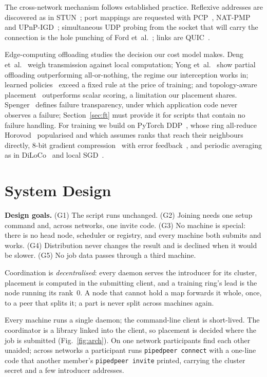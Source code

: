 \documentclass[conference]{IEEEtran}
\begin{document}
The cross-network mechanism follows established practice. Reflexive addresses
are discovered as in STUN~\cite{rfc8489}; port mappings are requested with
PCP~\cite{rfc6887}, NAT-PMP~\cite{rfc6886} and UPnP-IGD~\cite{upnpigd}; simultaneous UDP probing from the
socket that will carry the connection is the hole punching of Ford et~al.~\cite{ford2005p2p}; links are QUIC~\cite{rfc9000}.

Edge-computing offloading studies the decision our cost model makes. Deng et~al.~\cite{deng2023} weigh transmission against local computation; Yong et~al.~\cite{yong2023} show partial offloading outperforming all-or-nothing, the regime
our interception works in; learned policies~\cite{he2024} exceed a fixed rule at
the price of training; and topology-aware placement~\cite{zhao2023} outperforms
scalar scoring, a limitation our placement shares. Spenger~\cite{kth2025thesis}
defines failure transparency, under which application code never observes a
failure; Section~\ref{sec:ft} must provide it for scripts that contain no
failure handling. For training we build on PyTorch
DDP~\cite{li2020pytorchddp}, whose ring all-reduce Horovod~\cite{sergeev2018horovod}
popularised and which assumes ranks that reach their neighbours directly, 8-bit
gradient compression~\cite{dettmers2016eightbit}
with error feedback~\cite{seide2014onebit}, and periodic averaging as in
DiLoCo~\cite{douillard2023diloco} and local SGD~\cite{lin2020localsgd}.

\section{System Design}

\textbf{Design goals.} (G1) The script runs unchanged. (G2) Joining needs one
setup command and, across networks, one invite code. (G3) No machine is special:
there is no head node, scheduler or registry, and every machine both submits
and works. (G4) Distribution never changes the result and is declined when it
would be slower. (G5) No job data passes through a third machine.

Coordination is \emph{decentralised}: every daemon serves the introducer for
its cluster, placement is computed in the submitting client, and a training
ring's lead is the node running its rank~0. A node that cannot hold a map
forwards it whole, once, to a peer that splits it; a part is never split across
machines again.

Every machine runs a single daemon; the command-line client is short-lived. The
coordinator is a library linked into the client, so placement is decided where
the job is submitted (Fig.~\ref{fig:arch}). On one network participants find
each other unaided; across networks a participant runs \texttt{pipedpeer
connect} with a one-line code that another member's \texttt{pipedpeer invite}
printed, carrying the cluster secret and a few introducer addresses.
\end{document}
